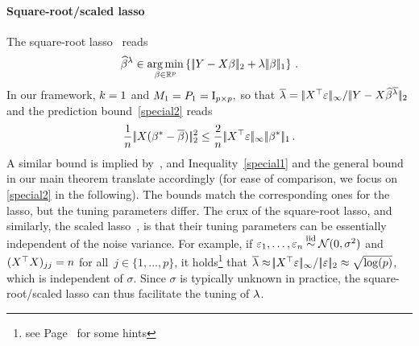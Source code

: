 \documentclass[bj]{imsart}
\newcommand{\normsup}[1]{\ensuremath{\!|\!| #1 | \! |_{\infty}}}
\newcommand{\normone}[1]{\ensuremath{\!|\!| #1 | \! |_{1}}}
\newcommand{\normtwo}[1]{\ensuremath{\!|\!| #1 | \! |_{2}}}
\newcommand{\1}{{\rm 1}\mskip -4,5mu{\rm l} }
\newcommand{\argmin}{\mathop{\mathrm{arg\,min}}}
\newcommand{\rp}{\mathbb{R}^p}
\newcommand{\betatrue}{\beta^*}
\newcommand{\lo}{\overline{\lambda}}
\begin{document}
\paragraph{Square-root/scaled lasso} The square-root lasso~\cite{Belloni11}  reads
\begin{equation*}
  \estimatort \in \argmin_{\beta\in\rp}\left\{\,\normtwo{\outcome-\design\beta}+\tuningparameter\,\normone{\beta}\right\}\,.
\end{equation*}
In our framework, $k=1$ and $M_1=P_1=\operatorname{I}_{p\times p},$ so that $\lo=\,\normsup{\design^\top\noise}/\,\normtwo{\outcome-\design\estimator^{\lo}}$ and the prediction bound~\eqref{special2} reads
\begin{equation*}
\frac{1}{n}\,\normtwo{\design(\betatrue-\estimatororacle)}^2 \le \frac 2 n\,\normsup{\design  ^\top\noise}\,   \normone{\betatrue}\,.
\end{equation*}
A similar bound is implied by~\cite[Theorem~1]{ScaledLasso11}, and Inequality~\eqref{special1} and the general bound in our main theorem translate accordingly (for ease of comparison, we focus on \eqref{special2} in the following). The bounds match the corresponding ones for the lasso, but the tuning parameters differ. The crux of the square-root lasso, and similarly, the scaled lasso~\cite{ScaledLasso11}, is that their tuning parameters can be essentially independent of the noise variance. For example,  if $\noise_1,\dots,\noise_n\iid\mathcal N(0,\sigma^2)$ and $(\textcolor{black}{X}^\top\textcolor{black}{X})_{jj}=n$ for all~$j\in\{1,\dots,p\}$, it holds\footnote{see Page~\pageref{sqrtexproof} for some hints} that $\lo\approx \normsup{\design^\top\noise}/\,\normtwo{\noise}\approx\sqrt{\log(p)}$, \label{sqrtex} which is independent of $\sigma.$ Since $\sigma$ is typically unknown in practice, the square-root/scaled lasso can thus facilitate the tuning of $\lambda$.
\end{document}
